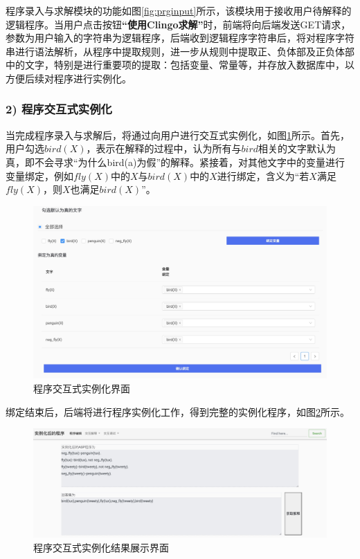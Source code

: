 程序录入与求解模块的功能如图\ref{fig:prginput}所示，该模块用于接收用户待解释的逻辑程序。当用户点击按钮\textbf{“使用Clingo求解”}时，前端将向后端发送GET请求，参数为用户输入的字符串为逻辑程序，后端收到逻辑程序字符串后，将对程序字符串进行语法解析，从程序中提取规则，进一步从规则中提取正、负体部及正负体部中的文字，特别是进行重要项的提取：包括变量、常量等，并存放入数据库中，以方便后续对程序进行实例化。

\subsubsection*{2) 程序交互式实例化}
当完成程序录入与求解后，将通过向用户进行交互式实例化，如图\ref{fig:prggrding}所示。首先，用户勾选$bird(X)$，表示在解释的过程中，认为所有与$bird$相关的文字默认为真，即不会寻求“为什么bird(a)为假”的解释。紧接着，对其他文字中的变量进行变量绑定，例如$fly(X)$中的$X$与$bird(X)$中的$X$进行绑定，含义为“若$X$满足$fly(X)$，则$X$也满足$bird(X)$”。

\begin{figure}
    \centering
    \includegraphics[width=0.8\linewidth]{figures/实例化交互.jpg}
    \caption{程序交互式实例化界面}
    \label{fig:prggrding}
\end{figure}

绑定结束后，后端将进行程序实例化工作，得到完整的实例化程序，如图\ref{fig:prggrdingoutput}所示。

\begin{figure}
    \centering
    \includegraphics[width=0.8\linewidth]{figures/实例化结果.jpg}
    \caption{程序交互式实例化结果展示界面}
    \label{fig:prggrdingoutput}
\end{figure}

